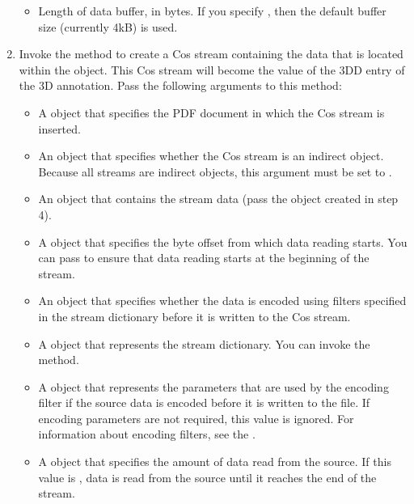 \documentclass[letterpaper,12pt,english,openany,oneside]{sphinxmanual}
\begin{document}
\begin{enumerate}
\begin{itemize}
\item {} 
Length of data buffer, in bytes. If you specify , then the default buffer size (currently 4kB) is used.

\end{itemize}

\item {} 
Invoke the  method to create a Cos stream containing the data that is located within the  object. This Cos stream will become the value of the 3DD entry of the 3D annotation. Pass the following arguments to this method:
\begin{itemize}
\item {} 
A  object that specifies the PDF document in which the Cos stream is inserted.

\item {} 
An  object that specifies whether the Cos stream is an indirect object. Because all streams are indirect objects, this argument must be set to .

\item {} 
An  object that contains the stream data (pass the  object created in step 4).

\item {} 
A  object that specifies the byte offset from which data reading starts. You can pass  to ensure that data reading starts at the beginning of the stream.

\item {} 
An  object that specifies whether the data is encoded using filters specified in the stream dictionary before it is written to the Cos stream.

\item {} 
A  object that represents the stream dictionary. You can invoke the  method.

\item {} 
A  object that represents the parameters that are used by the encoding filter if the source data is encoded before it is written to the file. If encoding parameters are not required, this value is ignored. For information about encoding filters, see the .

\item {} 
A  object that specifies the amount of data read from the source. If this value is , data is read from the source until it reaches the end of the stream.

\end{itemize}

\end{enumerate}
\end{document}
